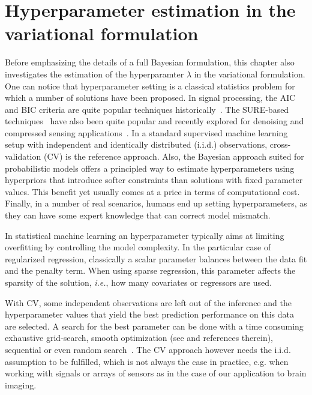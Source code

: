 \section{Hyperparameter estimation in the variational formulation}

Before emphasizing the details of a full Bayesian formulation, this chapter also investigates the estimation of the hyperparamter $\lambda$ in the variational formulation. One can notice that hyperparameter setting is a classical statistics problem for which a number of solutions have been proposed. In signal processing, the AIC and BIC criteria are quite popular techniques historically~\cite{schwarz1978estimating}. The SURE-based techniques~\cite{stein1981estimation} have also been quite popular and recently explored for denoising and compressed sensing applications~\cite{luisier2007new, guo2015near}. In a standard supervised machine learning setup with independent and identically distributed (i.i.d.) observations, cross-validation (CV) is the reference approach. 
Also, the Bayesian approach suited for probabilistic models offers a principled way to estimate hyperparameters using hyperpriors that introduce softer constraints than solutions with fixed parameter values. This benefit yet usually comes at a price in terms of computational cost. Finally, in a number of real scenarios, humans end up setting hyperparameters, as they can have some expert knowledge that can correct model mismatch.

In statistical machine learning an hyperparameter typically aims at limiting overfitting by controlling the model complexity. In the particular case of regularized regression, classically a scalar parameter balances between the data fit and the penalty term. When using sparse regression, this parameter affects the sparsity of the solution, \emph{i.e.}, how many covariates or regressors are used.

With CV, some independent observations are left out of the inference and the
hyperparameter values that yield the best prediction performance on this data are selected. A search for the best parameter can be done with a time consuming exhaustive grid-search, smooth optimization (see \cite{pedregosa2016hyperparameter} and references therein), sequential or even random search~\cite{bergstra2011algorithms, bergstra2012random}. The CV approach however needs the i.i.d. assumption to be fulfilled, which is not always the case in practice, e.g. when working with signals or arrays of sensors as in the case of our application to brain imaging.

